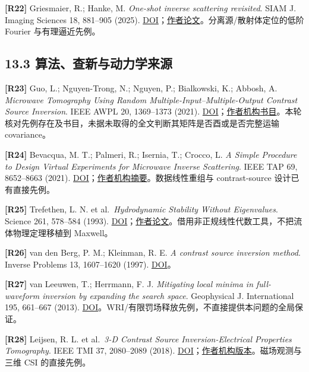 \documentclass[11pt,a4paper]{article}
\begin{document}
\textbf{{[}R22{]}} Griesmaier, R.; Hanke, M. \emph{One-shot inverse
scattering revisited}. SIAM J. Imaging Sciences 18, 881--905 (2025).
\href{https://doi.org/10.1137/24M1709753}{DOI}；\href{https://ianm.math.kit.edu/downloads/rg-ip/griesmaier/oneshotrevisited.pdf}{作者论文}。分离源/散射体定位的低阶
Fourier 与有理逼近先例。

\hypertarget{ux7b97ux6cd5ux67e5ux65b0ux4e0eux52a8ux529bux5b66ux6765ux6e90}{%
\subsection{13.3
算法、查新与动力学来源}\label{ux7b97ux6cd5ux67e5ux65b0ux4e0eux52a8ux529bux5b66ux6765ux6e90}}

\textbf{{[}R23{]}} Guo, L.; Nguyen-Trong, N.; Nguyen, P.; Bialkowski,
K.; Abbosh, A. \emph{Microwave Tomography Using Random
Multiple-Input--Multiple-Output Contrast Source Inversion}. IEEE AWPL
20, 1369--1373 (2021).
\href{https://doi.org/10.1109/LAWP.2021.3079905}{DOI}；\href{https://about.uq.edu.au/experts-publication/1006/4748}{作者机构书目}。本轮核对先例存在及书目，未据未取得的全文判断其矩阵是否酉或是否完整运输
covariance。

\textbf{{[}R24{]}} Bevacqua, M. T.; Palmeri, R.; Isernia, T.; Crocco, L.
\emph{A Simple Procedure to Design Virtual Experiments for Microwave
Inverse Scattering}. IEEE TAP 69, 8652--8663 (2021).
\href{https://doi.org/10.1109/TAP.2021.3083747}{DOI}；\href{https://iris.cnr.it/handle/20.500.14243/445596}{作者机构摘要}。数据线性重组与
contrast-source 设计已有直接先例。

\textbf{{[}R25{]}} Trefethen, L. N. et al.~\emph{Hydrodynamic Stability
Without Eigenvalues}. Science 261, 578--584 (1993).
\href{https://doi.org/10.1126/science.261.5121.578}{DOI}；\href{https://people.maths.ox.ac.uk/trefethen/publication/PDF/1993_57.pdf}{作者论文}。借用非正规线性代数工具，不把流体物理定理移植到
Maxwell。

\textbf{{[}R26{]}} van den Berg, P. M.; Kleinman, R. E. \emph{A contrast
source inversion method}. Inverse Problems 13, 1607--1620 (1997).
\href{https://doi.org/10.1088/0266-5611/13/6/013}{DOI}。

\textbf{{[}R27{]}} van Leeuwen, T.; Herrmann, F. J. \emph{Mitigating
local minima in full-waveform inversion by expanding the search space}.
Geophysical J. International 195, 661--667 (2013).
\href{https://doi.org/10.1093/gji/ggt258}{DOI}。WRI/有限罚场释放先例，不直接提供本问题的全局保证。

\textbf{{[}R28{]}} Leijsen, R. L. et al.~\emph{3-D Contrast Source
Inversion-Electrical Properties Tomography}. IEEE TMI 37, 2080--2089
(2018).
\href{https://doi.org/10.1109/TMI.2018.2816125}{DOI}；\href{https://pure.tudelft.nl/ws/portalfiles/portal/50622273/45203789_3D_CSI_EPT_Clean_Copy.pdf}{作者机构版本}。磁场观测与三维
CSI 的直接先例。
\end{document}
